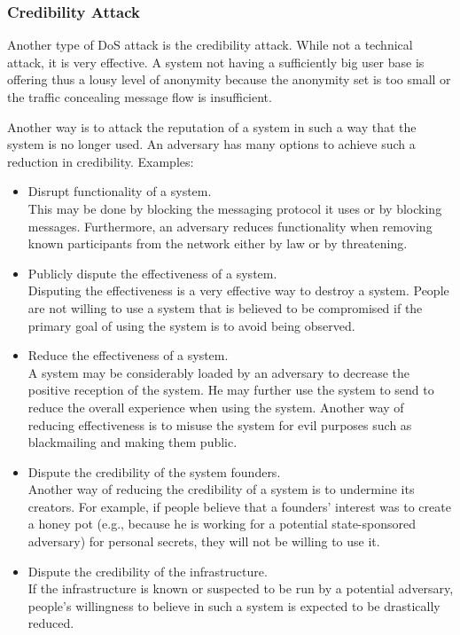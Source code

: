 \subsubsection{Credibility Attack}
Another type of DoS attack is the credibility attack. While not a technical attack, it is very effective. A system not having a sufficiently big user base is offering thus a lousy level of anonymity because the anonymity set is too small or the traffic concealing message flow is insufficient. 

Another way is to attack the reputation of a system in such a way that the system is no longer used. An adversary has many options to achieve such a reduction in credibility. Examples:
\begin{itemize}
	\item Disrupt functionality of a system.\\ 
	This may be done by blocking the messaging protocol it uses or by blocking messages. Furthermore, an adversary reduces functionality when removing known participants from the network either by law or by threatening.
	\item Publicly dispute the effectiveness of a system.\\
	Disputing the effectiveness is a very effective way to destroy a system. People are not willing to use a system that is believed to be compromised if the primary goal of using the system is to avoid being observed.
	\item Reduce the effectiveness of a system.\\
	A system may be considerably loaded by an adversary to decrease the positive reception of the system. He may further use the system to send  to reduce the overall experience when using the system. Another way of reducing effectiveness is to misuse the system for evil purposes such as blackmailing and making them public.
	\item Dispute the credibility of the system founders.\\
	Another way of reducing the credibility of a system is to undermine its creators. For example, if people believe that a founders' interest was to create a honey pot (e.g., because he is working for a potential state-sponsored adversary) for personal secrets, they will not be willing to use it.
	\item Dispute the credibility of the infrastructure.\\
	If the infrastructure is known or suspected to be run by a potential adversary, people's willingness to believe in such a system is expected to be drastically reduced.
\end{itemize}

